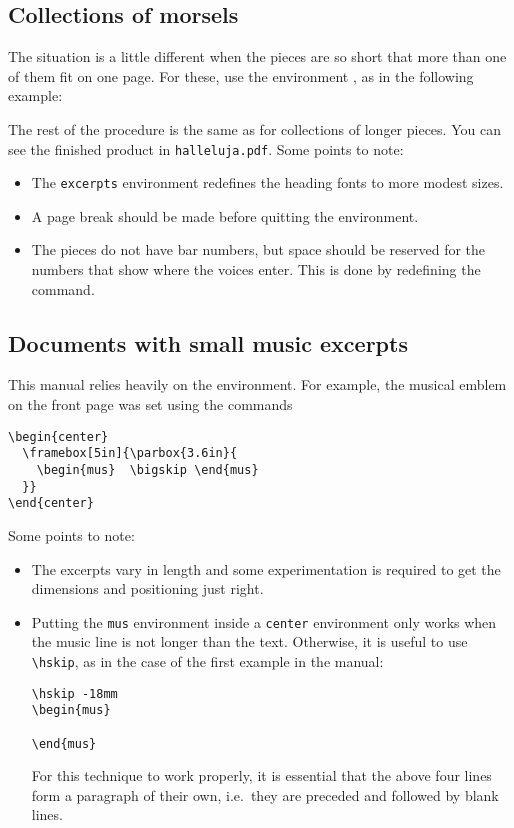 \documentclass[11pt]{article}
\begin{document}
\subsection{Collections of morsels}

The situation is a little different when the pieces are so short
that more than one of them fit on one page.  For these, use the
environment , as in the following example:

The rest of the procedure is the same as for collections of longer
pieces.
You can see the finished product in \texttt{halleluja.pdf}.
Some points to note: 
\begin{itemize}
  \item The \texttt{excerpts} environment redefines the heading fonts
to more modest sizes.
  \item A page break should be made before quitting the environment.
  \item The pieces do not have bar numbers, but space should be reserved
for the numbers that show where the voices enter.  This is done
by redefining the  command.
\end{itemize}

\subsection{Documents with small music excerpts}
   
This manual relies heavily on the  environment.  
For example, the 
musical emblem on the front page was set using the commands
\begin{verbatim}
\begin{center}  
  \framebox[5in]{\parbox{3.6in}{
    \begin{mus}  \bigskip \end{mus}
  }}        
\end{center}
\end{verbatim}
Some points to note: 
\begin{itemize}
  \item  The excerpts vary in length and some experimentation is
required to get the dimensions and positioning just right. 
  \item  Putting the \texttt{mus} environment inside a \texttt{center}
environment only works when the music line is not longer than the text.
Otherwise, it is useful to use \verb"\hskip", as in the case of the
first example in the manual:
\begin{verbatim}
\hskip -18mm
\begin{mus}

\end{mus}
\end{verbatim}
For this technique to work properly, it is essential that the above four
lines form a paragraph of their own, i.e.\ they are preceded and
followed by blank lines.  
\end{itemize}
\end{document}
